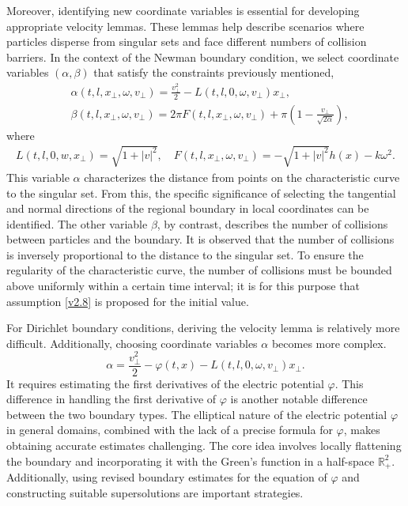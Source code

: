 \documentclass[11pt,reqno]{amsart}%
\theoremstyle{definition}
\theoremstyle{remark}
\begin{document}
Moreover, identifying new coordinate variables is essential for developing appropriate velocity lemmas. These lemmas help describe scenarios where particles disperse from singular sets and face different numbers of collision barriers. In the context of the Newman boundary condition, we select coordinate variables $(\alpha,\beta)$ that satisfy the constraints previously mentioned,%
\begin{align}
&\alpha(t,l,x_{\bot},\omega,v_{\bot})=\frac{v_{\bot}^{2}}{2}-L(t,l,0,\omega,v_{\bot})x_{\bot},\nonumber \\
&\beta(t, l,  x_{\bot}, \omega, v_{\bot})=2\pi F(t,l,x_{\bot},\omega,v_{\bot})+\pi (1-\frac{v_{\bot}}{\sqrt{2\alpha}}),\nonumber
\end{align}
where
\begin{align}
L(t,l,0,w,x_{\bot})=\sqrt{1+|v|^{2}}, \quad F(t,l,x_{\bot},\omega,v_{\bot})=-\sqrt{1+|v|^{2}}h(x)-k\omega^{2}.\nonumber
\end{align}
This variable  $\alpha$  characterizes the distance from points on the characteristic curve to the singular set. From this, the specific significance of selecting the tangential and normal directions of the regional boundary in local coordinates can be identified. The other variable  $\beta$, by contrast, describes the number of collisions between particles and the boundary. It is observed that the number of collisions is inversely proportional to the distance to the singular set. 
To ensure the regularity of the characteristic curve, the number of collisions must be bounded above uniformly within a certain time interval; it is for this purpose that assumption \eqref{v2.8} is proposed for the initial value.

For Dirichlet boundary conditions, deriving the velocity lemma is relatively more difficult. 
Additionally, choosing coordinate variables $\alpha$ becomes more complex.
$$\alpha=\frac{v_{\bot}^{2}}{2}-\varphi(t,x)-L(t,l,0,\omega,v_{\bot})x_{\bot}.$$
 It requires estimating the first derivatives of the electric potential  $\varphi$. This difference in handling the first derivative of  $\varphi$ is another notable difference between the two boundary types. The elliptical nature of the electric potential $\varphi$ in general domains, combined with the lack of a precise formula for $\varphi$, makes obtaining accurate estimates challenging. The core idea involves locally flattening the boundary and incorporating it with the Green's function in a half-space $\mathbb{R}^{2}_{+}$. Additionally, using revised boundary estimates for the  equation of $\varphi$ and constructing suitable supersolutions are important strategies.
\end{document}
